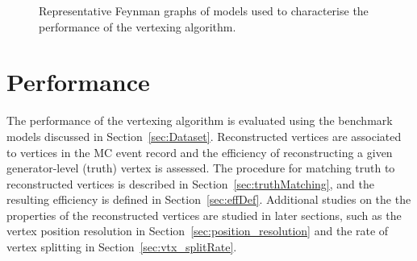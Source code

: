 \documentclass[PUB,UKenglish, texlive=2018]{\ATLASLATEXPATH atlasdoc}
\begin{document}
\begin{figure}[h]
\begin{center}
\caption{Representative Feynman graphs of models used to characterise the performance of the vertexing algorithm.}
\label{fig:feyModels}
\end{center}
\end{figure}



\section{Performance}\label{sec:performance}

The performance of the vertexing algorithm is evaluated using the benchmark models discussed in Section~\ref{sec:Dataset}. 
Reconstructed vertices are associated to vertices in the MC event record and the efficiency of reconstructing a given generator-level (truth) vertex is assessed.
The procedure for matching truth to reconstructed vertices is described in Section~\ref{sec:truthMatching}, and the resulting efficiency is defined in Section~\ref{sec:effDef}.
Additional studies on the the properties of the reconstructed vertices are studied in later sections, such as the vertex position resolution in Section~\ref{sec:position_resolution} and the rate of vertex splitting in Section~\ref{sec:vtx_splitRate}.
\end{document}
